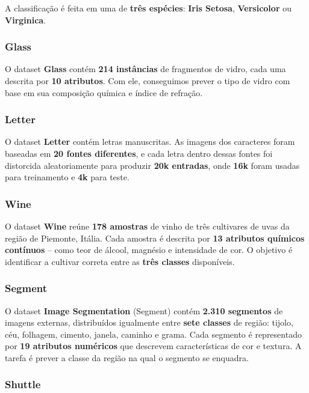 \documentclass{article}
\begin{document}
A classificação é feita em uma de \textbf{três espécies}: \textbf{Iris Setosa}, \textbf{Versicolor} ou \textbf{Virginica}.

\subsubsection{Glass}

O dataset \textbf{Glass} contém \textbf{214 instâncias} de fragmentos de vidro, cada uma descrita por \textbf{10 atributos}. Com ele, conseguimos prever o tipo de vidro com base em sua composição química e índice de refração.

\subsubsection{Letter}

O dataset \textbf{Letter} contém letras manuscritas. As imagens dos caracteres foram baseadas em \textbf{20 fontes diferentes}, e cada letra dentro dessas fontes foi distorcida aleatoriamente para produzir \textbf{20k entradas}, onde \textbf{16k} foram usadas para treinamento e \textbf{4k} para teste.

\subsubsection{Wine}

O dataset \textbf{Wine} reúne \textbf{178 amostras} de vinho de três cultivares de uvas da região de Piemonte, Itália. Cada amostra é descrita por \textbf{13 atributos químicos contínuos} – como teor de álcool, magnésio e intensidade de cor. O objetivo é identificar a cultivar correta entre as \textbf{três classes} disponíveis.

\subsubsection{Segment}

O dataset \textbf{Image Segmentation} (Segment) contém \textbf{2.310 segmentos} de imagens externas, distribuídos igualmente entre \textbf{sete classes} de região: tijolo, céu, folhagem, cimento, janela, caminho e grama. Cada segmento é representado por \textbf{19 atributos numéricos} que descrevem características de cor e textura. A tarefa é prever a classe da região na qual o segmento se enquadra.

\subsubsection{Shuttle}
\end{document}
